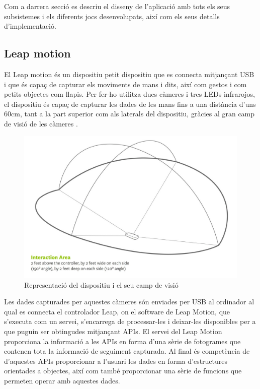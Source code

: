 \documentclass[12pt,a4paper,catalan]{article}
\begin{document}
	Com a darrera secció es descriu el disseny de l'aplicació amb tots els seus subsistemes i els diferents jocs desenvolupats, així com els seus detalls d'implementació.
	
	\subsection{Leap motion}
	El Leap motion és un dispositiu petit dispositiu que es connecta mitjançant USB i que és capaç de capturar els moviments de mans i dits, així com gestos i com petits objectes com llapis. Per fer-ho utilitza dues càmeres i tres LEDs infrarojos, el dispositiu és capaç de capturar les dades de les mans fins a una distància d'uns 60cm, tant a la part superior com als laterals del dispositiu, gràcies al gran camp de visió de les càmeres  \cite{leapcharacteristics}.
	\begin{figure}[H]
		\includegraphics[width=\textwidth,keepaspectratio]{leap-motion-interaction-area.png}
		\centering
		\caption{Representació del dispositiu i el seu camp de visió \protect\cite{leapcharacteristics}}
	\end{figure}
	Les dades capturades per aquestes càmeres són enviades per USB al ordinador al qual es connecta el controlador Leap, on el software de Leap Motion, que s'executa com un servei, s'encarrega de processar-les i deixar-les disponibles per a que puguin ser obtingudes mitjançant APIs.
	El servei del Leap Motion proporciona la informació a les APIs en forma d'una sèrie de fotogrames que contenen tota la informació de seguiment capturada. Al final és competència de d'aquestes APIs proporcionar a l'usuari les dades en forma d'estructures orientades a objectes, així com també proporcionar una sèrie de funcions que permeten operar amb aquestes dades.
	
\end{document}
